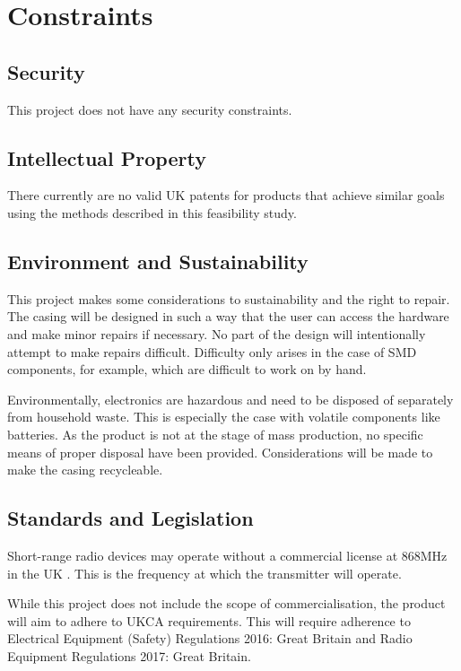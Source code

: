 \documentclass[11pt]{article}
\begin{document}
\section{Constraints}
\subsection{Security}
This project does not have any security constraints.

\subsection{Intellectual Property}
There currently are no valid UK patents for products that achieve similar goals using the methods described in this feasibility study. 
\subsection{Environment and Sustainability}
This project makes some considerations to sustainability and the right to repair. The casing will be designed in such a way that the user can access the hardware and make minor repairs if necessary. 
No part of the design will intentionally attempt to make repairs difficult. Difficulty only arises in the case of SMD components, for example, which are difficult to work on by hand.

Environmentally, electronics are hazardous and need to be disposed of separately from household waste.
This is especially the case with volatile components like batteries.
As the product is not at the stage of mass production, no specific means of proper disposal have been provided. 
Considerations will be made to make the casing recycleable. 

\subsection{Standards and Legislation}
Short-range radio devices may operate without a commercial license at 868MHz in the UK \cite{ofcom:licenceexempt,ofcom:consultation}.
This is the frequency at which the transmitter will operate.

While this project does not include the scope of commercialisation, the product will aim to adhere to UKCA requirements.
This will require adherence to Electrical Equipment (Safety) Regulations 2016: Great Britain and Radio Equipment Regulations 2017: Great Britain.
\end{document}
